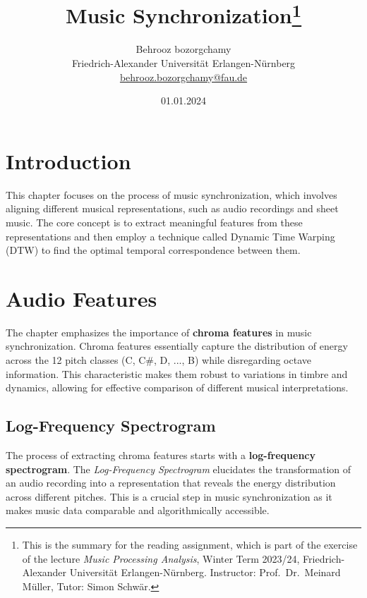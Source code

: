 \documentclass[a4paper, 9pt, twocolumn]{extarticle}
\begin{document}
\date{\normalsize 01.01.2024}

\title{\vspace{-8mm}\textbf{\Large
Music Synchronization\footnote{This is the summary for the reading assignment,
which is part of the exercise of the lecture \emph{Music Processing Analysis}, Winter Term 2023/24,
Friedrich-Alexander Universit\"at Erlangen-N\"urnberg.
Instructor: Prof.\ Dr.\ Meinard M\"uller,
Tutor: Simon Schw\"ar.
}}}

\author{
{
\begin{minipage}{\textwidth}
\center
Behrooz bozorgchamy\\
\small
Friedrich-Alexander Universit\"at Erlangen-N\"urnberg
\protect\\{} %
\url{behrooz.bozorgchamy@fau.de}
\end{minipage}
}
}

\maketitle
\thispagestyle{empty}

\section{Introduction}
\label{section:introduction}

This chapter focuses on the process of music synchronization, which
involves aligning different musical representations, such as audio
recordings and sheet music. The core concept is to extract meaningful
features from these representations and then employ a technique called
Dynamic Time Warping (DTW) to find the optimal temporal correspondence
between them.
\section{Audio Features}
The chapter emphasizes the importance of \textbf{chroma features} in music
synchronization. Chroma features essentially capture the distribution of
energy across the 12 pitch classes (C, C\#, D, ..., B) while
disregarding octave information. This characteristic makes them robust
to variations in timbre and dynamics, allowing for effective comparison
of different musical interpretations.
\subsection{Log-Frequency Spectrogram}
The process of extracting chroma features starts with a
\textbf{log-frequency spectrogram}. The \emph{Log-Frequency Spectrogram}
elucidates the transformation of an audio recording into a
representation that reveals the energy distribution across different
pitches. This is a crucial step in music synchronization as it makes
music data comparable and algorithmically accessible.
\end{document}
